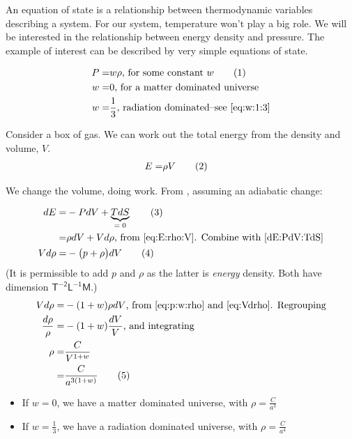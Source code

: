 \documentclass[]{article}
\newcommand\numberthis{\addtocounter{equation}{1}\tag{\theequation}}
\begin{document}
An equation of state is a relationship between thermodynamic variables describing a system. For our system, temperature won't play a big role. We will be interested in the relationship between energy density and pressure. The example of interest can be described by very simple equations of state.

\begin{align*}
	P =& w \rho\text{, for some constant $w$} \numberthis \label{eq:p:w:rho}\\
	w =& 0 \text {, for a matter dominated universe}\\
	w =& \frac{1}{3} \text{, radiation dominated--see \eqref{eq:w:1:3}}
\end{align*}

Consider a box of gas. We can work out the total energy from the density and volume, $V$.
\begin{align*}
	E =& \rho V \numberthis \label{eq:E:rho:V}
\end{align*}
 
We change the volume, doing work. From \cite[Statistical Mechanics, Lecture 6]{susskind2007theoretical}, assuming an adiabatic change:

\begin{align*}
	dE =& -P dV + \underbrace{T dS}_\text{$=0$} \numberthis \label{dE:PdV:TdS}\\
	=& \rho dV + V d\rho \text{, from \eqref{eq:E:rho:V}. Combine with \eqref{dE:PdV:TdS}}\\
	V d\rho =& -\big(p+\rho\big)dV \numberthis \label{eq:Vdrho}
\end{align*}
(It is permissible to add $p$ and $\rho$ as the latter is \emph{energy} density. Both have dimension $\mathsf{T^{-2}L^{-1}M}$.)
\begin{align*}
	V d\rho =& - (1+w)\rho dV \text{, from \eqref{eq:p:w:rho} and \eqref{eq:Vdrho}. Regrouping}\\
	\frac{d\rho}{\rho} =& - (1+w)\frac{dV}{V} \text{, and integrating}\\
	\rho =& \frac{C}{V^{1+w}}\\
	=& \frac{C}{a^{3(1+w)}}\numberthis \label{eq:rho:a}
\end{align*}

\begin{itemize}
	\item If $w=0$, we have a matter dominated universe, with $\rho=\frac{C}{a^3}$
	\item If $w=\frac{1}{3}$, we have a radiation  dominated universe, with $\rho=\frac{C}{a^4}$
\end{itemize}
\end{document}
